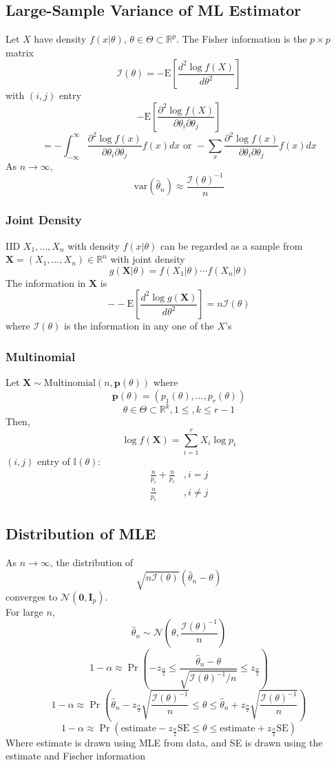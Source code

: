 \documentclass{article}
\begin{document}
\begin{multicols}{2}
\subsection{Large-Sample Variance of ML Estimator}
Let $X$ have density $f(x|\theta)$, $\theta\in\Theta\subset \mathbb{R}^p$. The Fisher information is the $p \times p$ matrix
$$\mathcal{I}(\theta) = -\text{E}\left[\frac{d^2\log{f(X)}}{d\theta^2}\right]$$
with $(i,j)$ entry
$$-\text{E}\left[\frac{\partial^2\log f(X)}{\partial\theta_i\partial\theta_j}\right]$$
$$=-\int_{-\infty}^{\infty}\frac{\partial^2\log f(x)}{\partial\theta_i\partial\theta_j}f(x)dx \text{ or }-\sum_{x}\frac{\partial^2\log f(x)}{\partial\theta_i\partial\theta_j}f(x)dx$$
As $n\rightarrow \infty$,
$$\text{var}(\hat{\theta}_n)\approx \frac{\mathcal{I}(\theta)^{-1}}{n}$$
\subsubsection{Joint Density}
IID $X_1, \dots , X_n$ with density $f(x|\theta)$ can be regarded as a sample from $\textbf{X}=(X_1,\dots , X_n) \in \mathbb{R}^n$ with joint density
$$g(\textbf{X}|\theta) = f(X_1|\theta) \cdots f(X_n|\theta)$$
The information in $\textbf{X}$ is
$$--\text{E}\left[\frac{d^2\log{g(\textbf{X})}}{d\theta^2}\right] = n\mathcal{I}(\theta)$$
where $\mathcal{I}(\theta)$ is the information in any one of the $X$'s
\subsubsection{Multinomial}
Let $\textbf{X}\sim\text{Multinomial}(n,\textbf{p}(\theta))$ where
$$\textbf{p}(\theta) = (p_1(\theta), \dots, p_r(\theta))$$
$$\theta \in \Theta \subset \mathbb{R}^k, 1\leq, k\leq r-1$$
Then,
$$\log f(\textbf{X}) = \sum_{i=1}^{r}X_i\log{p_i}$$
$(i,j)$ entry of $\mathbb{I}(\theta)$:
\begin{equation*}
\begin{aligned}
\frac{n}{p_i} + \frac{n}{p_r}&, i=j\\
\frac{n}{p_r}&, i\neq j
\end{aligned}
\end{equation*}
\subsection{Distribution of MLE}
As $n\rightarrow\infty$, the distribution of
$$\sqrt{n\mathcal{I}(\theta)}(\hat{\theta}_n-\theta)$$ converges to $\mathcal{N}(\textbf{0}, \textbf{I}_p)$.\\
For large $n$,
$$\hat{\theta}_n \sim \mathcal{N}\left(\theta, \frac{\mathcal{I}(\theta)^{-1}}{n}\right)$$
$$1-\alpha \approx \Pr\left(-z_{\frac{\alpha}{2}}\leq \frac{\hat{\theta}_n - \theta}{\sqrt{\mathcal{I}(\theta)^{-1}/n}}\leq z_{\frac{\alpha}{2}}\right)$$
$$1-\alpha \approx \Pr\left( \hat{\theta}_n - z_{\frac{\alpha}{2}}\sqrt{\frac{\mathcal{I}(\theta)^{-1}}{n}}\leq \theta \leq \hat{\theta}_n + z_{\frac{\alpha}{2}}\sqrt{\frac{\mathcal{I}(\theta)^{-1}}{n}} \right)$$
$$1-\alpha \approx \Pr(\text{estimate}-z_{\frac{\alpha}{2}}\text{SE} \leq \theta \leq \text{estimate}+z_{\frac{\alpha}{2}}\text{SE} )$$
Where estimate is drawn using MLE from data, and SE is drawn using the estimate and Fischer information

\end{multicols}
\end{document}
